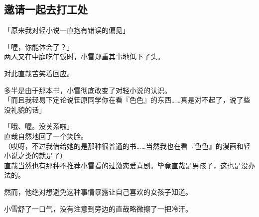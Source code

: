 \subsection{邀请一起去打工处}

「原来我对轻小说一直抱有错误的偏见」

「喔，你能体会了？」\\

两人又在中庭吃午饭时，小雪郑重其事地低下了头。

对此直哉苦笑着回应。

多半是由于那本书，小雪彻底改变了对轻小说的认识。\\

「而且我轻易下定论说笹原同学你在看『色色』的东西……真是对不起了，说了些没礼貌的话」

「哦、喔。没关系啦」\\

直哉自然地回了一个笑脸。\\

（哎呀，不过我借给她的是那种很普通的书……当然我也在看『色色』的漫画和轻小说之类的就是了）\\

直哉当然也有那种不推荐小雪看的过激恋爱喜剧。毕竟直哉是男孩子，这也是没办法的。

然而，他绝对想避免这种事情暴露让自己喜欢的女孩子知道。

小雪舒了一口气，没有注意到旁边的直哉略微擦了一把冷汗。\\


